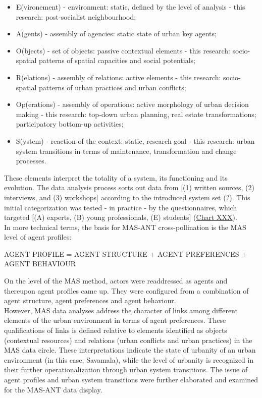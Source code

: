 \documentclass[11pt]{report}
\begin{document}
\begin{itemize}
\item E(vironement) - environment: static, defined by the level of analysis - this research: post-socialist neighbourhood;
\item A(gents) - assembly of agencies: static state of urban key agents;
\item O(bjects) - set of objects: passive contextual elements - this research: socio-spatial patterns of spatial capacities and social potentials;
\item R(elations) - assembly of relations: active elements - this research: socio-spatial patterns of urban practices and urban conflicts;
\item Op(erations) - assembly of operations: active morphology of urban decision making - this research: top-down urban planning, real estate transformations; participatory bottom-up activities;
\item S(ystem) - reaction of the context: static, research goal - this research:  urban system transitions in terms of maintenance, transformation and change processes.
\end{itemize}

These elements interpret the totality of a system, its functioning and its evolution.
The data analysis process sorts out data from [(1) written sources, (2) interviews, and (3) workshops] according to the introduced system set (?).
This initial categorization was tested - in practice - by the questionnaires, which targeted [(A) experts, (B) young professionals, (E) students] (\href{Table data sources}{Chart XXX}).
\\
In more technical terms, the basis for MAS-ANT cross-pollination is the MAS level of agent profiles:

AGENT PROFILE = AGENT STRUCTURE + AGENT PREFERENCES + AGENT BEHAVIOUR

On the level of the MAS method, actors were readdressed as agents and thereupon agent profiles came up. They were configured from a combination of agent structure, agent preferences and agent behaviour.
\\

However, MAS data analyses address the character of links among different elements of the urban environment in terms of agent preferences. These qualifications of links is defined relative to elements identified as objects (contextual resources) and relations (urban conflicts and urban practices) in the MAS data circle. These interpretations indicate the state of urbanity of an urban environment (in this case, Savamala), while the level of urbanity is recognized in their further operationalization through urban system transitions. The issue of agent profiles and urban system transitions were further elaborated and examined for the MAS-ANT data display.
\end{document}
